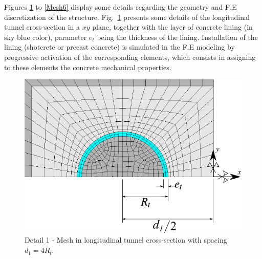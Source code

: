 \documentclass[Journal,letterpaper, NoLists,SectionNumbers]{ascelike-new}
\begin{document}
Figures \ref{Mesh2} to \ref{Mesh6} display some details regarding the geometry and F.E discretization of the structure. Fig.~\ref{Mesh2} presents some details of the longitudinal tunnel cross-section in a $xy$ plane, together with the layer of concrete lining (in sky blue color), parameter $e_t$ being the thickness of the lining. Installation of the lining (shotcrete or precast concrete) is simulated in the F.E modeling by progressive activation of the corresponding elements, which consists in assigning to these elements the concrete mechanical properties.
\begin{figure}[h!]
	\centering
	\includegraphics[scale=0.8]{Mesh2.pdf}
	\caption{Detail 1 - Mesh in longitudinal tunnel cross-section with spacing $d_1=4R_t$.}
	\label{Mesh2}
\end{figure}
\end{document}
